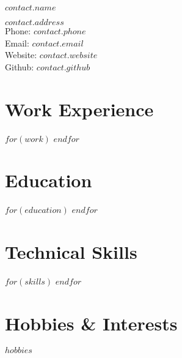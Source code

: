 \documentclass{cv-class}
\begin{document}
{\LARGE $contact.name$}\\
\smallskip

$contact.address$\\
Phone: $contact.phone$\\
Email: $contact.email$\\
Website: $contact.website$\\
Github: $contact.github$

\section*{Work Experience}
$for(work)$
$endfor$

\section*{Education}
$for(education)$
$endfor$

\section*{Technical Skills}
$for(skills)$
$endfor$

\section*{Hobbies \& Interests}
$hobbies$
\end{document}
